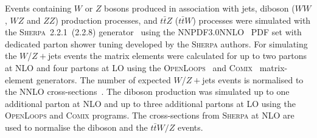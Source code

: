 Events containing $W$ or $Z$ bosons produced in association with jets,
diboson ($WW$, $WZ$ and $ZZ$) production processes, 
and $t\bar tZ$ ($t\bar tW$)
processes were simulated with the 
\textsc{Sherpa}~2.2.1~(2.2.8) generator~\cite{Bothmann:2019yzt} 
using the 
NNPDF3.0NNLO~\cite{Ball:2014uwa} PDF set
with dedicated parton shower tuning developed by the \textsc{Sherpa} authors.
For simulating the $W$/$Z+$jets events 
the matrix elements were calculated
for up to two partons at NLO and four partons at LO using the 
\textsc{OpenLoops}~\cite{Cascioli:2011va}
and \textsc{Comix}~\cite{Gleisberg:2008fv} matrix-element generators.
The number of expected $W$/$Z+$jets events 
is normalised to the NNLO cross-sections~\cite{Catani:2009sm}.
The diboson production was simulated 
up to one additional parton at NLO and up to three additional
partons at LO using the 
\textsc{OpenLoops} and \textsc{Comix} programs.
The cross-sections from \textsc{Sherpa} at NLO 
are used to normalise the diboson
and the $t\bar tW/Z$ events.


